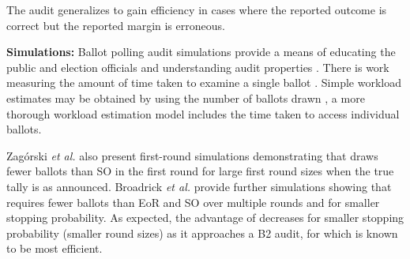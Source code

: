 The \ALPHA audit \cite{alpha} generalizes \BRAVO to gain efficiency in cases where the reported outcome is correct but the reported margin is erroneous.

{\bf Simulations:} Ballot polling audit simulations provide a means of educating the public and election officials \cite{dice} and understanding audit properties \cite{mclaughlin_thesis,simulations_house, blom_IRV, DBLP:conf/evoteid/HuangRSTV20,bravo}. There is work measuring the amount of time taken to examine a single ballot \cite{RI-report}. 
Simple workload estimates may be obtained by using the number of ballots drawn \cite{bernoulli-ballot-polling}, a more thorough workload estimation model includes the time taken to access individual ballots\cite{bernhard-diss}. 

Zag\'{o}rski {\em et al.}  also present first-round simulations demonstrating that \Minerva draws fewer ballots than SO \BRAVO in the first round for large first round sizes when the true tally is as announced. Broadrick {\em et al.} provide further simulations showing that \Minerva requires fewer ballots than EoR and SO \BRAVO over multiple rounds and for smaller stopping probability. As expected, the advantage of \Minerva decreases for smaller stopping probability (smaller round sizes) as it approaches a B2 audit, 
for which \BRAVO is known to be most efficient. 

